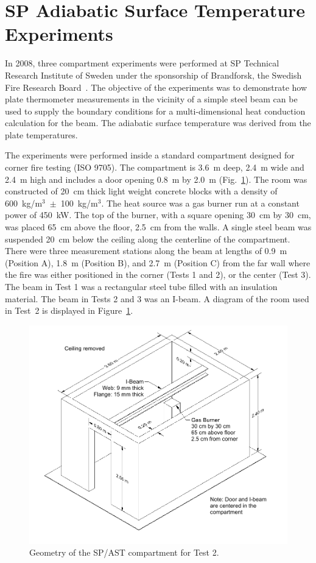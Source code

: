 \section{SP Adiabatic Surface Temperature Experiments}
\label{SP_AST_Description}

In 2008, three compartment experiments were performed at SP Technical Research Institute of Sweden under the sponsorship of Brandforsk, the Swedish Fire Research Board~\cite{Wickstrom_AST}. The objective of the experiments was to demonstrate how plate thermometer measurements in the vicinity of a simple steel beam can be used to supply the boundary conditions for a multi-dimensional heat conduction calculation for the beam. The adiabatic surface temperature was derived from the plate temperatures.

The experiments were performed inside a standard compartment designed for corner fire testing (ISO 9705). The compartment is 3.6~m deep, 2.4~m wide and 2.4~m high and includes a door opening 0.8~m by 2.0~m (Fig.~\ref{Room_Drawing}). The room was constructed of 20~cm thick light weight concrete blocks with a density of 600~kg/m$^3$~$\pm$~100~kg/m$^3$. The heat source was a gas burner run at a constant power of 450~kW. The top of the burner, with a square opening 30~cm by 30~cm, was placed 65~cm above the floor, 2.5~cm from the walls. A single steel beam was suspended 20~cm below the ceiling along the centerline of the compartment. There were three measurement stations along the beam at lengths of 0.9~m (Position A), 1.8~m (Position B), and 2.7~m (Position C) from the far wall where the fire was either positioned in the corner (Tests 1 and 2), or the center (Test 3). The beam in Test 1 was a rectangular steel tube filled with an insulation material. The beam in Tests 2 and 3 was an I-beam. A diagram of the room used in Test~2 is displayed in Figure~\ref{Room_Drawing}.

\begin{figure}[!ht]
\includegraphics[width=\textwidth]{FIGURES/SP_AST/SP_AST_Compartment_Drawing}
\caption[Geometry of the  SP/AST compartment for Test 2]{Geometry of the  SP/AST compartment for Test 2.}
\label{Room_Drawing}
\end{figure}

